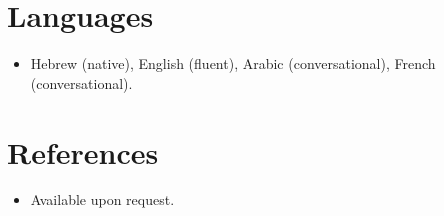 \documentclass[11pt,a4paper,sans]{moderncv}
\begin{document}

\section{Languages}
\vspace{1pt}
\begin{itemize}
\item Hebrew (native), English (fluent), Arabic (conversational), French (conversational).
\end{itemize}


\section{References}
\vspace{1pt}
\begin{itemize}
\item{Available upon request.}
\end{itemize}
\end{document}
